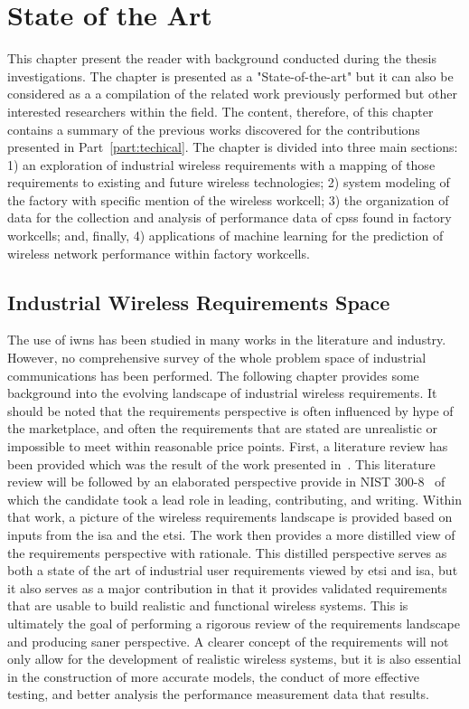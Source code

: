 
\chapter{State of the Art}\label{chapter:soa}

\chapterintro*

This chapter present the reader with background conducted during the thesis investigations. The chapter is presented as a "State-of-the-art" but it can also be considered as a a compilation of the related work previously performed but other interested researchers within the field.  The content, therefore, of this chapter contains a summary of the previous works discovered for the contributions presented in Part~\ref{part:techical}.  The chapter is divided into three main sections: 1) an exploration of industrial wireless requirements with a mapping of those requirements to existing and future wireless technologies; 2) system modeling of the factory with specific mention of the wireless workcell; 3) the organization of data for the collection and analysis of performance data of \glspl{cps} found in factory workcells; and, finally, 4) applications of machine learning for the prediction of wireless network performance within factory workcells. 

\section{Industrial Wireless Requirements Space}\label{sec:requirements-space}

The use of \glspl{iwn} has been studied in many works in the literature and industry. However, no comprehensive survey of the whole problem space of industrial communications has been performed.   The following chapter provides some background into the evolving landscape of industrial wireless requirements.  It should be noted that the requirements perspective is often influenced by hype of the marketplace, and often the requirements that are stated are unrealistic or impossible to meet within reasonable price points.  First, a literature review has been provided which was the result of the work presented in~\cite{CandellRW2017}.  This literature review will be followed by an elaborated perspective provide in NIST 300-8~\cite{Montgomery2019} of which the candidate took a lead role in leading, contributing, and writing.  Within that work, a picture of the wireless requirements landscape is provided based on inputs from the \gls{isa} and the \gls{etsi}.  The work then provides a more distilled view of the requirements perspective with rationale.  This distilled perspective serves as both a state of the art of industrial user requirements viewed by \gls{etsi} and \gls{isa}, but it also serves as a major contribution in that it provides validated requirements that are usable to build realistic and functional wireless systems.  This is ultimately the goal of performing a rigorous review of the requirements landscape and producing saner perspective.  A clearer concept of the requirements will not only allow for the development of realistic wireless systems, but it is also essential in the construction of more accurate models, the conduct of more effective testing, and better analysis the performance measurement data that results.


